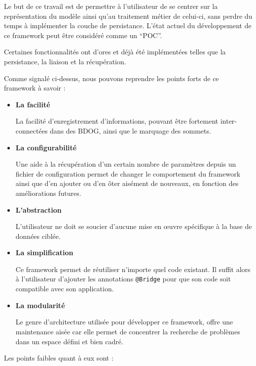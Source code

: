 \documentclass[a4paper,fleqn,12pt]{report}
\begin{document}
Le but de ce travail est de permettre à l'utilisateur de se centrer sur la représentation du modèle ainsi qu'au traitement métier de celui-ci, sans perdre du temps à implémenter la couche de persistance. L'état actuel du développement de ce framework peut être considéré comme un \enquote{POC}.

Certaines fonctionnalités ont d'ores et déjà été implémentées telles que la persistance, la liaison et la récupération.

Comme signalé ci-dessus, nous pouvons reprendre les points forts de ce framework à savoir :

\begin{itemize}
\item \textbf{La facilité}

\quad La facilité d'enregistrement d'informations, pouvant être fortement inter-connectées dans des BDOG, ainsi que le marquage des sommets.

\item \textbf{La configurabilité}

\quad Une aide à la récupération d'un certain nombre de paramètres depuis un fichier de configuration permet de changer le comportement du framework ainsi que d'en ajouter ou d'en ôter aisément de nouveaux, en fonction des améliorations futures.

\item \textbf{L'abstraction}

\quad L'utilisateur ne doit se soucier d'aucune mise en œuvre spécifique à la base de données ciblée. 

\item \textbf{La simplification}

\quad Ce framework permet de réutiliser n'importe quel code existant. Il suffit alors à l'utilisateur d'ajouter les annotations \texttt{@Bridge} pour que son code soit compatible avec son application.

\item \textbf{La modularité}

\quad Le genre d'architecture utilisée pour développer ce framework, offre une maintenance aisée car elle permet de concentrer la recherche de problèmes dans un espace défini et bien cadré.

\end{itemize}

Les points faibles quant à eux sont :
\end{document}
